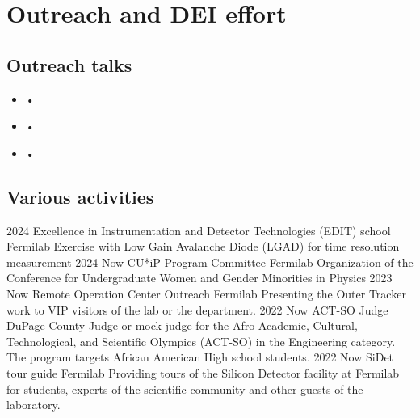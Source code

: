 \ifacademic
  \section{Outreach and DEI effort}
  \subsection{Outreach talks}
\vskip 10pt

\begin{itemize}

\item  {} • ~

\item  {} • ~

\item  {} • ~

\end{itemize}

\subsection{Various activities}
\position
      {2024} 
      {Excellence in Instrumentation and Detector Technologies (EDIT) school}
      {Fermilab}
      {Exercise with Low Gain Avalanche Diode (LGAD) for time resolution measurement}
\position
      {2024 \textemdash{} Now} 
      {CU*iP Program Committee}
      {Fermilab}
      {Organization of the Conference for Undergraduate Women and Gender Minorities in Physics}
\position
      {2023 \textemdash{} Now} 
      {Remote Operation Center Outreach}
      {Fermilab}
      {Presenting the Outer Tracker work to VIP visitors of the lab or the department.}
\position
      {2022 \textemdash{} Now} 
      {ACT-SO Judge}
      {DuPage County}
      {Judge or mock judge for the Afro-Academic, Cultural, Technological, and Scientific Olympics (ACT-SO) in the Engineering category. The program targets African American High school students.}
     \position
      {2022 \textemdash{} Now} 
      {SiDet tour guide}
      {Fermilab}
      {Providing tours of the Silicon Detector facility at Fermilab for students, experts of the scientific community and other guests of the laboratory.}

